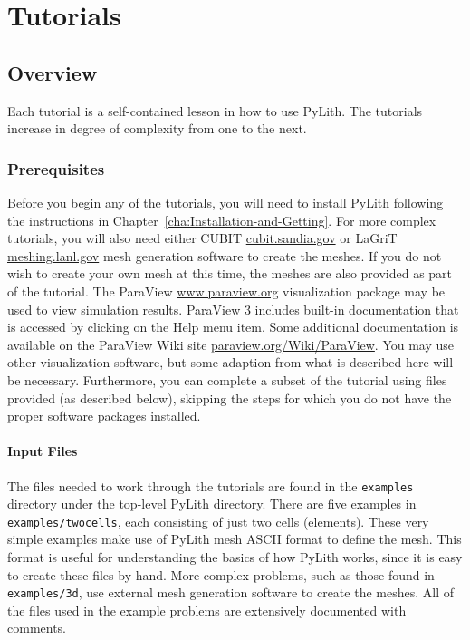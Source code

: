 
\chapter{\label{cha:Tutorials}Tutorials}


\section{Overview}

Each tutorial is a self-contained lesson in how to use PyLith. The
tutorials increase in degree of complexity from one to the next.


\subsection{Prerequisites}

Before you begin any of the tutorials, you will need to install PyLith
following the instructions in Chapter~\ref{cha:Installation-and-Getting}.
For more complex tutorials, you will also need either CUBIT \url{cubit.sandia.gov}
or LaGriT \url{meshing.lanl.gov} mesh generation software to create
the meshes. If you do not wish to create your own mesh at this time,
the meshes are also provided as part of the tutorial. The ParaView
\url{www.paraview.org} visualization package may be used to view
simulation results. ParaView 3 includes built-in documentation that
is accessed by clicking on the Help menu item. Some additional documentation
is available on the ParaView Wiki site \url{paraview.org/Wiki/ParaView}.
You may use other visualization software, but some adaption from what
is described here will be necessary. Furthermore, you can complete
a subset of the tutorial using files provided (as described below),
skipping the steps for which you do not have the proper software packages
installed.


\subsubsection{Input Files}

The files needed to work through the tutorials are found in the \texttt{examples}
directory under the top-level PyLith directory. There are five examples
in \texttt{examples/twocells}, each consisting of just two cells (elements).
These very simple examples make use of PyLith mesh ASCII format to
define the mesh. This format is useful for understanding the basics
of how PyLith works, since it is easy to create these files by hand.
More complex problems, such as those found in \texttt{examples/3d},
use external mesh generation software to create the meshes. All of
the files used in the example problems are extensively documented
with comments.

